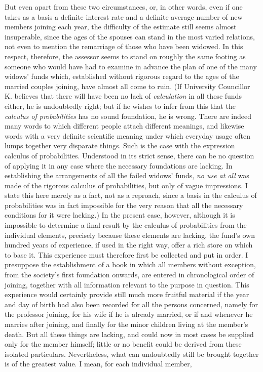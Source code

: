 But even apart from these two circumstances, or, in other words, even if one takes as a basis a definite interest rate and a definite average number of new members joining each year, the difficulty of the estimate still seems almost insuperable, since the ages of the spouses can stand in the most varied relations, not even to mention the remarriage of those who have been widowed. In this respect, therefore, the assessor seems to stand on roughly the same footing as someone who would have had to examine in advance the plan of one of the many widows' funds which, established without rigorous regard to the ages of the married couples joining, have almost all come to ruin. (If University Councillor K. believes that there will have been no lack of \textit{calculation} in all these funds either, he is undoubtedly right; but if he wishes to infer from this that the \textit{calculus of probabilities} has no sound foundation, he is wrong. There are indeed many words to which different people attach different meanings, and likewise words with a very definite scientific meaning under which everyday usage often lumps together very disparate things. Such is the case with the expression calculus of probabilities. Understood in its strict sense, there can be no question of applying it in any case where the necessary foundations are lacking. In establishing the arrangements of all the failed widows' funds, \textit{no use at all} was made of the rigorous calculus of probabilities, but only of vague impressions. I state this here merely as a fact, not as a reproach, since a basis in the calculus of probabilities was in fact impossible for the very reason that all the necessary conditions for it were lacking.) In the present case, however, although it is impossible to determine a final result by the calculus of probabilities from the individual elements, precisely because these elements are lacking, the fund's own hundred years of experience, if used in the right way, offer a rich store on which to base it. This experience must therefore first be collected and put in order. I presuppose the establishment of a book in which all members without exception, from the society's first foundation onwards, are entered in chronological order of joining, together with all information relevant to the purpose in question. This experience would certainly provide still much more fruitful material if the year and day of birth had also been recorded for all the persons concerned, namely for the professor joining, for his wife if he is already married, or if and whenever he marries after joining, and finally for the minor children living at the member's death. But all these things are lacking, and could now in most cases be supplied only for the member himself; little or no benefit could be derived from these isolated particulars. Nevertheless, what can undoubtedly still be brought together is of the greatest value. I mean, for each individual member,

